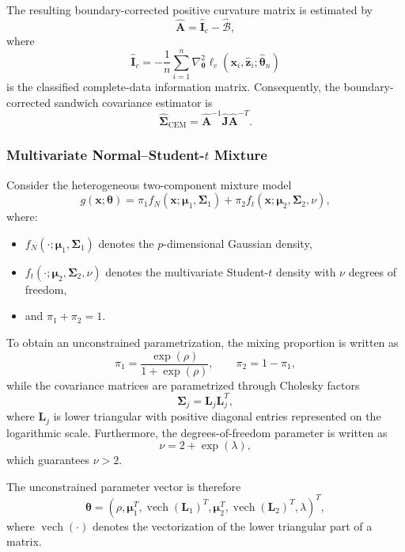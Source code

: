 \documentclass[pdflatex,sn-mathphys-ay]{sn-jnl}%
\newcommand{\vech}{\operatorname{vech}}
\let\oldtheta\theta
\renewcommand{\theta}{\boldsymbol{\oldtheta}}
\let\oldmu\mu
\renewcommand{\mu}{\boldsymbol{\oldmu}}
\let\oldSigma\Sigma
\renewcommand{\Sigma}{\boldsymbol{\oldSigma}}
\theoremstyle{thmstyleone}%
\theoremstyle{thmstyletwo}%
\theoremstyle{thmstylethree}%
\begin{document}
The resulting boundary-corrected positive curvature matrix is estimated by
\[
    \widehat{\mathbf{A}}
    =
    \widehat{\mathbf{I}}_c
    -
    \widehat{\mathcal{B}},
\]
where
\[
    \widehat{\mathbf{I}}_c
    =
    -
    \frac{1}{n}
    \sum_{i=1}^n
    \nabla_{\boldsymbol{\theta}}^2
    \ell_c
    (\mathbf{x}_i,\widehat{\mathbf{z}}_i;\widehat{\boldsymbol{\theta}}_n)
\]
is the classified complete-data information matrix. Consequently, the boundary-corrected sandwich covariance estimator is
\[
    \widehat{\boldsymbol{\Sigma}}_{\mathrm{CEM}}
    =
    \widehat{\mathbf{A}}^{-1}
    \widehat{\mathbf{J}}
    \widehat{\mathbf{A}}^{-T}.
\]

\subsubsection{Multivariate Normal--Student-\texorpdfstring{$t$}{t} Mixture}

Consider the heterogeneous two-component mixture model
\[
    g(\mathbf{x};\boldsymbol{\theta})
    =
    \pi_1
    f_N(\mathbf{x};\boldsymbol{\mu}_1,\boldsymbol{\Sigma}_1)
    +
    \pi_2
    f_t(\mathbf{x};\boldsymbol{\mu}_2,\boldsymbol{\Sigma}_2,\nu),
\]
where:
\begin{itemize}
    \item $f_N(\cdot;\boldsymbol{\mu}_1,\boldsymbol{\Sigma}_1)$ denotes the $p$-dimensional Gaussian density,
    \item $f_t(\cdot;\boldsymbol{\mu}_2,\boldsymbol{\Sigma}_2,\nu)$ denotes the multivariate Student-$t$ density with $\nu$ degrees of freedom,
    \item and $\pi_1+\pi_2=1$.
\end{itemize}

To obtain an unconstrained parametrization, the mixing proportion is written as
\[
    \pi_1
    =
    \frac{\exp(\rho)}
    {1+\exp(\rho)},
    \qquad
    \pi_2
    =
    1-\pi_1,
\]
while the covariance matrices are parametrized through Cholesky factors
\[
    \boldsymbol{\Sigma}_j=\mathbf{L}_j\mathbf{L}_j^T,
\]
where $\mathbf{L}_j$ is lower triangular with positive diagonal entries represented on the logarithmic scale. Furthermore, the degrees-of-freedom parameter is written as
\[
    \nu
    =
    2+\exp(\lambda),
\]
which guarantees $\nu>2$.

The unconstrained parameter vector is therefore
\[
   \boldsymbol{\theta}
    =
    (
    \rho,
    \boldsymbol{\mu}_1^T,
    \vech(\mathbf{L}_1)^T,
    \boldsymbol{\mu}_2^T,
    \vech(\mathbf{L}_2)^T,
    \lambda
    )^T,
\]
where $\vech(\cdot)$ denotes the vectorization of the lower triangular part of a matrix.
\end{document}
